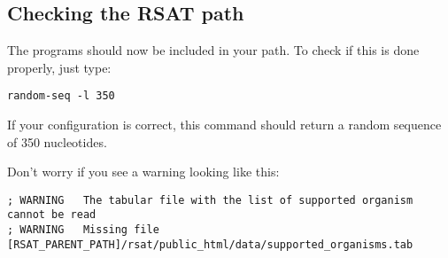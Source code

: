 \documentclass[12pt,a4paper, oneside]{scrreprt} %
\begin{document}









\subsection{Checking the RSAT path}

The \RSAT programs should now be included in your path.  To check if
this is done properly, just type:

\begin{lstlisting}
random-seq -l 350
\end{lstlisting}

If your configuration is correct, this command should return a random
sequence of 350 nucleotides.

Don't worry if you see a warning looking like this:

\begin{footnotesize}
\begin{verbatim}
; WARNING	The tabular file with the list of supported organism cannot be read
; WARNING	Missing file	[RSAT_PARENT_PATH]/rsat/public_html/data/supported_organisms.tab
\end{verbatim}
\end{footnotesize}
\end{document}
